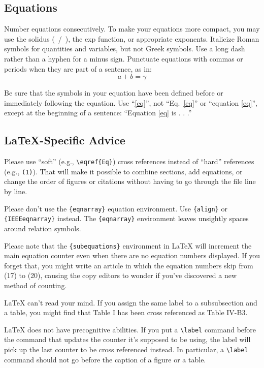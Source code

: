 \documentclass[conference]{IEEEtran}
\begin{document}
\subsection{Equations}
Number equations consecutively. To make your 
equations more compact, you may use the solidus (~/~), the exp function, or 
appropriate exponents. Italicize Roman symbols for quantities and variables, 
but not Greek symbols. Use a long dash rather than a hyphen for a minus 
sign. Punctuate equations with commas or periods when they are part of a 
sentence, as in:
\begin{equation}
a+b=\gamma\label{eq}
\end{equation}

Be sure that the 
symbols in your equation have been defined before or immediately following 
the equation. Use ``\eqref{eq}'', not ``Eq.~\eqref{eq}'' or ``equation \eqref{eq}'', except at 
the beginning of a sentence: ``Equation \eqref{eq} is . . .''

\subsection{\LaTeX-Specific Advice}

Please use ``soft'' (e.g., \verb|\eqref{Eq}|) cross references instead
of ``hard'' references (e.g., \verb|(1)|). That will make it possible
to combine sections, add equations, or change the order of figures or
citations without having to go through the file line by line.

Please don't use the \verb|{eqnarray}| equation environment. Use
\verb|{align}| or \verb|{IEEEeqnarray}| instead. The \verb|{eqnarray}|
environment leaves unsightly spaces around relation symbols.

Please note that the \verb|{subequations}| environment in {\LaTeX}
will increment the main equation counter even when there are no
equation numbers displayed. If you forget that, you might write an
article in which the equation numbers skip from (17) to (20), causing
the copy editors to wonder if you've discovered a new method of
counting.


{\LaTeX} can't read your mind. If you assign the same label to a
subsubsection and a table, you might find that Table I has been cross
referenced as Table IV-B3. 

{\LaTeX} does not have precognitive abilities. If you put a
\verb|\label| command before the command that updates the counter it's
supposed to be using, the label will pick up the last counter to be
cross referenced instead. In particular, a \verb|\label| command
should not go before the caption of a figure or a table.
\end{document}
